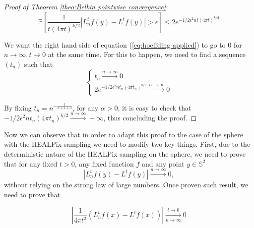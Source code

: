 \begin{proof}[Proof of Theorem \ref{theo:Belkin pointwise convergence}]
\begin{equation}
	\label{eq:hoeffding applied}
	\mathbb{P}\left[\frac{1}{t(4 \pi t)^{k / 2}}\left|L_{n}^{t} f(y)- L^{t} f(y)\right|>\epsilon\right] \leq 2 e^{-1 / 2 \epsilon^{2} n t(4 \pi t)^{k / 2}}
\end{equation}

We want the right hand side of equation (\ref{eq:hoeffding applied}) to go to $0$ for $n\to\infty, t\to0$ at the same time. For this to happen, we need to find a sequence $(t_n)$ such that 
$$\begin{cases}
t_n\xrightarrow{n\to\infty}0\\
2 e^{-1 / 2 \epsilon^{2} n t_n(4 \pi t_n)^{k / 2}}\xrightarrow{n\to\infty}0\\
\end{cases}$$

By fixing $t_n=n^{-\frac{1}{k+2+\alpha}}$, for any $\alpha>0$, it is easy to check that \\$-1 / 2 \epsilon^{2} n t_n(4 \pi t_n)^{k / 2}\xrightarrow{n\to\infty}+\infty$, thus concluding the proof.

\end{proof}

Now we can observe that in order to adapt this proof to the case of the sphere with the HEALPix sampling  we need to modify two key things. First, due to the deterministic nature of the HEALPix sampling on the sphere, we need to prove that for any fixed $t>0$, any fixed function $f$ and any point $y\in\mathbb S^2$ 
\begin{equation}\label{eq:limit}
	\left|L_n^tf(y)-L^tf(y)\right|\xrightarrow{n\to \infty} 0,
\end{equation}
without relying on the strong law of large numbers. Once proven such result, we need to prove that

$$\left|\frac{1}{4\pi t^2}\left(L_n^tf(x) - L^tf(x)\right)\right|\xrightarrow[n\to \infty]{t\to 0}0$$

